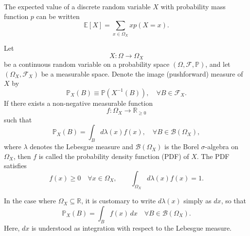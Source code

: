 \begin{theorem}
	The expected value of a discrete random variable $X$ with probability mass function $p$ can be written
	\begin{equation}
		\mathbb{E}[X]=\sum_{x\in \Omega_X}xp(X = x).
	\end{equation}
\end{theorem}

\begin{definition}
	\label{def:pdf}
	Let
	\begin{equation}
		X: \Omega \to \Omega_X
	\end{equation} 
	be a continuous random variable on a probability space $(\Omega, \mathcal{F}, \mathbb{P})$, and let $(\Omega_X, \mathcal{F}_X)$ be a measurable space. Denote the image (pushforward) measure of $X$ by
	\begin{equation}
		\mathbb{P}_X(B) \equiv \mathbb{P}(X^{-1}(B)), \quad \forall B \in \mathcal{F}_X.
	\end{equation}
	If there exists a non-negative measurable function
	\begin{equation}
		f: \Omega_X \to \mathbb{R}_{\ge 0}
	\end{equation} 
	such that
	\begin{equation}
		\mathbb{P}_X(B) = \int_B d\lambda(x) f(x), \quad \forall B \in \mathcal{B}(\Omega_X),
	\end{equation}
	where $\lambda$ denotes the Lebesgue measure and $\mathcal{B}(\Omega_X)$ is the Borel $\sigma$-algebra on $\Omega_X$, then $f$ is called the probability density function (PDF) of $X$. The PDF satisfies
	\begin{equation}
		f(x) \ge 0 \quad \forall x \in \Omega_X, 
		\qquad 
		\int_{\Omega_X} d\lambda(x) f(x) = 1.
	\end{equation}
\end{definition}

\begin{remark}
	In the case where $\Omega_X \subseteq \mathbb{R}$, it is customary to write $d\lambda(x)$ simply as $dx$, so that
	\begin{equation}
		\mathbb{P}_X(B) = \int_B f(x)\, dx \quad \forall B \in \mathcal{B}(\Omega_X).
	\end{equation}
	Here, $dx$ is understood as integration with respect to the Lebesgue measure.
\end{remark}

